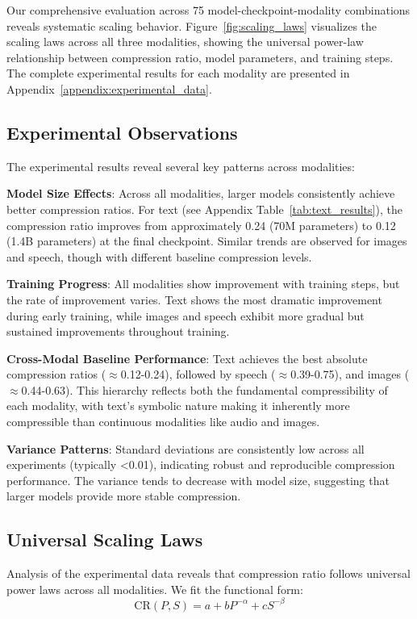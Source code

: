 \documentclass[11pt]{article}
\begin{document}
Our comprehensive evaluation across 75 model-checkpoint-modality combinations reveals systematic scaling behavior. Figure~\ref{fig:scaling_laws} visualizes the scaling laws across all three modalities, showing the universal power-law relationship between compression ratio, model parameters, and training steps. The complete experimental results for each modality are presented in Appendix~\ref{appendix:experimental_data}.

\subsection{Experimental Observations}

The experimental results reveal several key patterns across modalities:

\textbf{Model Size Effects}: Across all modalities, larger models consistently achieve better compression ratios. For text (see Appendix Table~\ref{tab:text_results}), the compression ratio improves from approximately 0.24 (70M parameters) to 0.12 (1.4B parameters) at the final checkpoint. Similar trends are observed for images and speech, though with different baseline compression levels.

\textbf{Training Progress}: All modalities show improvement with training steps, but the rate of improvement varies. Text shows the most dramatic improvement during early training, while images and speech exhibit more gradual but sustained improvements throughout training.

\textbf{Cross-Modal Baseline Performance}: Text achieves the best absolute compression ratios ($\approx$0.12-0.24), followed by speech ($\approx$0.39-0.75), and images ($\approx$0.44-0.63). This hierarchy reflects both the fundamental compressibility of each modality, with text's symbolic nature making it inherently more compressible than continuous modalities like audio and images.

\textbf{Variance Patterns}: Standard deviations are consistently low across all experiments (typically <0.01), indicating robust and reproducible compression performance. The variance tends to decrease with model size, suggesting that larger models provide more stable compression.

\subsection{Universal Scaling Laws}

Analysis of the experimental data reveals that compression ratio follows universal power laws across all modalities. We fit the functional form:
\[
\mathrm{CR}(P,S) = a + b P^{-\alpha} + c S^{-\beta}
\]
\end{document}
